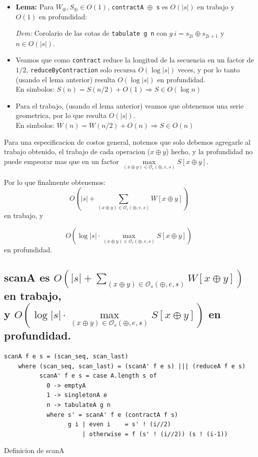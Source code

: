 \documentclass[12pt]{article}
\begin{document}
\begin{itemize}
\item \textbf{Lema:} Para $W_\oplus,S_\oplus \in O(1)$, \texttt{contractA $\oplus$ s} es $O(|s|)$ en trabajo y $O(1)$ en profundidad:

 \textit{Dem:} Corolario de las cotas de \texttt{tabulate g n} con $g\ i = s_{2i}\oplus s_{2i+1}$ y $n\in O(|s|)$.
\end{itemize}
\begin{itemize}
\item Veamos que como \texttt{contract} reduce la longitud de la secuencia en un factor de $1/2$, \texttt{reduceByContraction} solo recursa $O(\log |s|)$ veces, y por lo tanto (usando el lema anterior) resulta $O(\log |s|)$ en profundidad.\\
En simbolos: $S(n) = S(n/2) + O(1) \Rightarrow S \in O(\log n)$

\item Para el trabajo, (usando el lema anterior) veamos que obtenemos una serie geometrica, por lo que resulta $O(|s|)$.\\
En simbolos: $W(n) = W(n/2) + O(n) \Rightarrow S \in O(n)$
\end{itemize}
Para una especificacion de costos general, notemos que solo debemos agregarle al trabajo obtenido, el trabajo de cada operacion ($x\oplus y$) hecho, y la profundidad no puede empeorar mas que en un factor $\max\limits_{(x\oplus y)\in\mathcal{O}_r(\oplus,e,s)} S[x\oplus y]$.

Por lo que finalmente obtenemos:
$$O(|s| + \sum\limits_{(x\oplus y)\in\mathcal{O}_r(\oplus,e,s)} W[x\oplus y])$$ en trabajo, y

$$ O(\log |s|\cdot \max\limits_{(x\oplus y)\in\mathcal{O}_r(\oplus,e,s)} S[x\oplus y])$$ en profundidad.

\subsection{scanA es $O(|s| + \sum\limits_{(x\oplus y)\in\mathcal{O}_s(\oplus,e,s)} W[x\oplus y])$ en trabajo,\\
y $ O(\log |s|\cdot \max\limits_{(x\oplus y)\in\mathcal{O}_s(\oplus,e,s)} S[x\oplus y])$ en profundidad.}



\begin{table}[h]
\begin{lstlisting}
scanA f e s = (scan_seq, scan_last)
    where (scan_seq, scan_last) = (scanA' f e s) ||| (reduceA f e s)
          scanA' f e s = case A.length s of
            0 -> emptyA
            1 -> singletonA e
            n -> tabulateA g n
            where s' = scanA' f e (contractA f s)
                  g i | even i    = s' ! (i//2)
                      | otherwise = f (s' ! (i//2)) (s ! (i-1))
\end{lstlisting}
\caption{Definicion de scanA}
\end{table}
\end{document}
